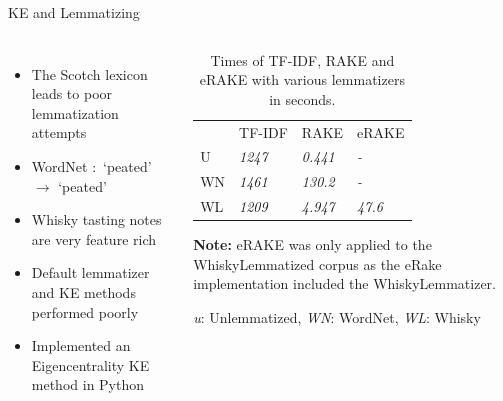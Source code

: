 \documentclass{beamer}
\begin{document}
\begin{frame}{KE and Lemmatizing}
    \begin{columns}[c] %
    \begin{itemize}
        \item The Scotch lexicon leads to poor lemmatization attempts
        \item WordNet $:$ `peated' $\rightarrow$ `peated'
        \item Whisky tasting notes are very feature rich
        \item Default lemmatizer and KE methods performed poorly
        \item Implemented an Eigencentrality KE method in Python
    \end{itemize}
            
    \begin{table}
        \centering
        \begin{threeparttable}
    
            \caption{Times of TF-IDF, RAKE and eRAKE with various lemmatizers in seconds.}\label{tab:times}
            \begin{tabular}{llll} 
            \toprule
                               & TF-IDF        & RAKE           & eRAKE           \\
            U       & \textit{1247} & \textit{0.441} & \textit{-}      \\
            WN & \textit{1461} & \textit{130.2} & \textit{-}      \\
            WL   & \textit{1209} & \textit{4.947} & \textit{47.6}  \\
            \bottomrule
            \end{tabular}
            \begin{tablenotes}
                \small
                \item \textbf{Note:} eRAKE was only applied to the WhiskyLemmatized corpus
                as the eRake implementation included the WhiskyLemmatizer.
                \item \emph{u}: Unlemmatized, \emph{WN}: WordNet, \emph{WL}: Whisky
            \end{tablenotes}
        \end{threeparttable}
    \end{table}
    \end{columns}
    \end{frame}
\end{document}
